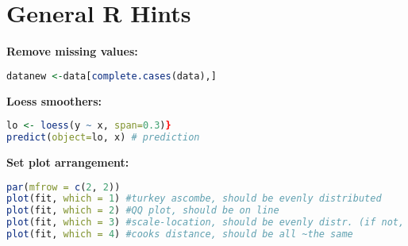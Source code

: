 \section{General R Hints}
\textbf{Remove missing values: }
\begin{lstlisting}[language = R]
datanew <-data[complete.cases(data),]
\end{lstlisting}
\textbf{Loess smoothers: } 
\begin{lstlisting}[language = R]
lo <- loess(y ~ x, span=0.3)}
predict(object=lo, x) # prediction
\end{lstlisting}
\textbf{Set plot arrangement:}
\begin{lstlisting}[language = R]
par(mfrow = c(2, 2))
plot(fit, which = 1) #turkey ascombe, should be evenly distributed
plot(fit, which = 2) #QQ plot, should be on line
plot(fit, which = 3) #scale-location, should be evenly distr. (if not, no heteroscedasticity)
plot(fit, which = 4) #cooks distance, should be all ~the same
\end{lstlisting}
